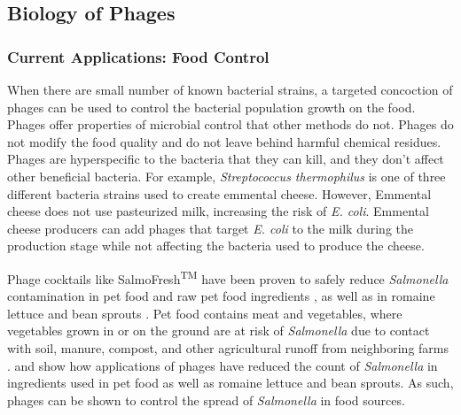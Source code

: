 \subsection{Biology of Phages}
\subsubsection{Current Applications: Food Control}

When there are small number of known bacterial strains, a targeted concoction of phages can be used to control the bacterial population growth on the food. Phages offer properties of microbial control that other methods do not. Phages do not modify the food quality and do not leave behind harmful chemical residues. Phages are hyperspecific to the bacteria that they can kill, and they don't affect other beneficial bacteria. For example, \textit{Streptococcus thermophilus} is one of three different bacteria strains used to create emmental cheese. However, Emmental cheese does not use pasteurized milk, increasing the risk of \textit{E. coli}. Emmental cheese producers can add phages that target \textit{E. coli} to the milk during the production stage while not affecting the bacteria used to produce the cheese. \newline 


Phage cocktails like SalmoFresh\textsuperscript{TM} have been proven to safely reduce \textit{Salmonella} contamination in pet food and raw pet food ingredients \cite{sofferBacteriophagesSafelyReduce2016}, as well as in romaine lettuce and bean sprouts \cite{zhangSalmoFreshEffectivenessControlling2019}. Pet food contains meat and vegetables, where vegetables grown in or on the ground are at risk of \textit{Salmonella} due to contact with soil, manure, compost, and other agricultural runoff from neighboring farms \cite{kowalskaFreshVegetablesFruit2023}.  \cite{sofferBacteriophagesSafelyReduce2016} and  \cite{zhangSalmoFreshEffectivenessControlling2019} show how applications of phages have reduced the count of \textit{Salmonella} in ingredients used in pet food as well as romaine lettuce and bean sprouts. As such, phages can be shown to control the spread of \textit{Salmonella} in food sources. 

